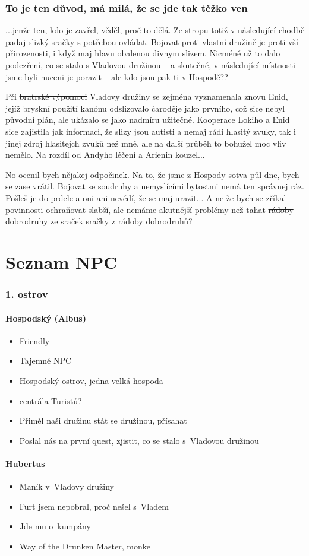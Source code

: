 \documentclass[a4paper,twocolumn,openany,nodeprecatedcode, justified]{dndbook}
\newcommand{\bi}{\begin{itemize}}
\newcommand{\ei}{\end{itemize}}
\begin{document}
	\section[Sezení 2]{To je ten důvod, má milá, že se jde tak těžko ven}
	...jenže ten, kdo je zavřel, věděl, proč to dělá. Ze stropu totiž v následující chodbě padaj slizký sračky s potřebou ovládat. Bojovat proti vlastní družině je proti vší přirozenosti, i když maj hlavu obalenou divnym slizem. Nicméně už to dalo podezření, co se stalo s Vladovou družinou -- a skutečně, v následující místnosti jsme byli nuceni je porazit -- ale kdo jsou pak ti v Hospodě??
	
	Při \sout{bratrské výpomoci}  Vladovy družiny se zejména vyznamenala znovu Enid, jejíž bryskní použití kanónu odslizovalo čaroděje jako prvního, což sice nebyl původní plán, ale ukázalo se jako nadmíru užitečné. Kooperace Lokiho a Enid sice zajistila jak informaci, že slizy jsou autisti a nemaj rádi hlasitý zvuky, tak i jinej zdroj hlasitejch zvuků než mně, ale na další průběh to bohužel moc vliv nemělo. Na rozdíl od Andyho léčení a Arienin kouzel...
	
	No ocenil bych nějakej odpočinek. Na to, že jsme z Hospody sotva půl dne, bych se zase vrátil. Bojovat se soudruhy a nemyslícími bytostmi nemá ten správnej ráz. Pošleš je do prdele a oni ani nevědí, že se maj urazit... A ne že bych se zříkal povinnosti ochraňovat slabší, ale nemáme akutnější problémy než tahat \sout{rádoby dobrodruhy ze sraček} sračky z rádoby dobrodruhů?
			
	
	\part{Seznam NPC}
	\section{1. ostrov}
	\subsection[Hospodský]{Hospodský (Albus)}
	\bi
		\item Friendly
		\item Tajemné NPC
		\item Hospodský ostrov, jedna velká hospoda
		\item centrála Turistů?
		\item Přiměl naši družinu stát se družinou, přísahat
		\item Poslal nás na první quest, zjistit, co se stalo s~Vladovou družinou
	\ei
	\subsection{Hubertus}
	\bi
		\item Maník v~Vladovy družiny
		\item Furt jsem nepobral, proč nešel s~Vladem
		\item Jde mu o~kumpány
		\item Way of the Drunken Master, monke
	\ei
	
	
	
\end{document}
